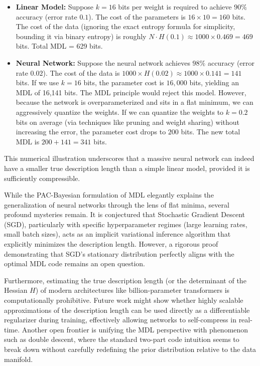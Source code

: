 \begin{itemize}
    \item \textbf{Linear Model:} Suppose $k=16$ bits per weight is required to achieve $90\%$ accuracy (error rate $0.1$). The cost of the parameters is $16 \times 10 = 160$ bits. The cost of the data (ignoring the exact entropy formula for simplicity, bounding it via binary entropy) is roughly $N \cdot H(0.1) \approx 1000 \times 0.469 = 469$ bits. Total MDL = 629 bits.
    \item \textbf{Neural Network:} Suppose the neural network achieves $98\%$ accuracy (error rate $0.02$). The cost of the data is $1000 \times H(0.02) \approx 1000 \times 0.141 = 141$ bits. If we use $k=16$ bits, the parameter cost is $16,000$ bits, yielding an MDL of 16,141 bits. The MDL principle would reject this model. However, because the network is overparameterized and sits in a flat minimum, we can aggressively quantize the weights. If we can quantize the weights to $k=0.2$ bits on average (via techniques like pruning and weight sharing) without increasing the error, the parameter cost drops to $200$ bits. The new total MDL is $200 + 141 = 341$ bits. 
\end{itemize}

This numerical illustration underscores that a massive neural network can indeed have a smaller true description length than a simple linear model, provided it is sufficiently compressible.

\begin{horizon}
While the PAC-Bayesian formulation of MDL elegantly explains the generalization of neural networks through the lens of flat minima, several profound mysteries remain. It is conjectured that Stochastic Gradient Descent (SGD), particularly with specific hyperparameter regimes (large learning rates, small batch sizes), acts as an implicit variational inference algorithm that explicitly minimizes the description length. However, a rigorous proof demonstrating that SGD's stationary distribution perfectly aligns with the optimal MDL code remains an open question. 

Furthermore, estimating the true description length (or the determinant of the Hessian $H$) of modern architectures like billion-parameter transformers is computationally prohibitive. Future work might show whether highly scalable approximations of the description length can be used directly as a differentiable regularizer during training, effectively allowing networks to self-compress in real-time. Another open frontier is unifying the MDL perspective with phenomenon such as double descent, where the standard two-part code intuition seems to break down without carefully redefining the prior distribution relative to the data manifold.
\end{horizon}

